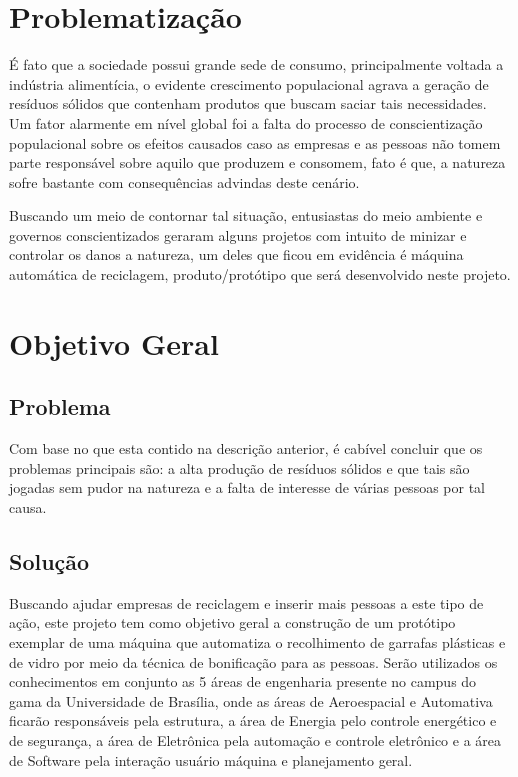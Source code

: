 \section{Problematização}

É fato que a sociedade possui grande sede de consumo, principalmente voltada a indústria alimentícia, o evidente crescimento populacional agrava a geração de resíduos sólidos que contenham produtos que buscam saciar tais necessidades. Um fator alarmente em nível global foi a falta do processo de conscientização populacional sobre os efeitos causados caso as empresas e as pessoas não tomem parte responsável sobre aquilo que produzem e consomem, fato é que, a natureza sofre bastante com consequências advindas deste cenário.

Buscando um meio de contornar tal situação, entusiastas do meio ambiente e governos conscientizados geraram alguns projetos com intuito de minizar e controlar os danos a natureza, um deles que ficou em evidência é máquina automática de reciclagem, produto/protótipo que será desenvolvido neste projeto.

\section{Objetivo Geral}

\subsection{Problema}
Com base no que esta contido na descrição anterior, é cabível concluir que os problemas principais são: a alta produção de resíduos sólidos e que tais são jogadas sem pudor na natureza e a falta de interesse de várias pessoas por tal causa.  

\subsection{Solução}
Buscando ajudar empresas de reciclagem e inserir mais pessoas a este tipo de ação, este projeto tem como objetivo geral a construção de um protótipo exemplar de uma máquina que automatiza o recolhimento de garrafas plásticas e de vidro por meio da técnica de bonificação para as pessoas. Serão utilizados os conhecimentos em conjunto as 5 áreas de engenharia presente no campus do gama da Universidade de Brasília, onde as áreas de Aeroespacial e Automativa ficarão responsáveis pela estrutura, a área de Energia pelo controle energético e de segurança, a área de Eletrônica pela automação e controle eletrônico e a área de Software pela interação usuário máquina e planejamento geral.

